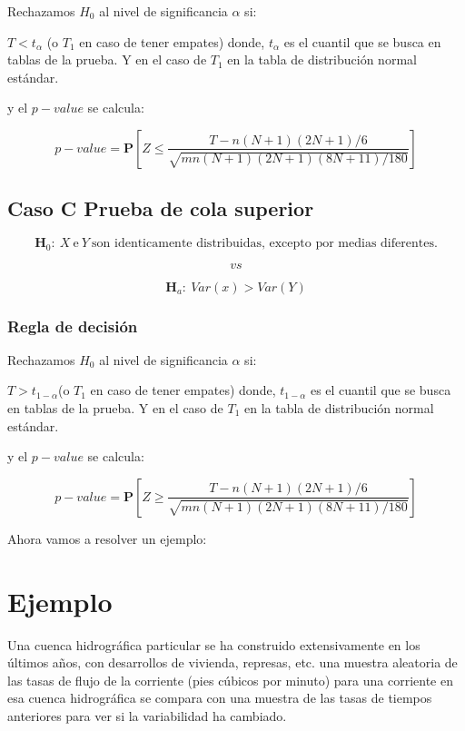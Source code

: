 \documentclass[
  a4paper,
  oneside,
  openany]{book}
\begin{document}
Rechazamos \(H_0\) al nivel de significancia \(\alpha\) si:

\(T<t_\alpha\) (o \(T_1\) en caso de tener empates) donde, \(t_\alpha\) es el cuantil que se busca en tablas de la prueba. Y en el caso de \(T_{1}\) en la tabla de distribución normal estándar.

y el \(p-value\) se calcula:

\[ p-value= \mathbf{P}\left[Z\leq\frac{T-n(N+1)(2N+1)/6}{\sqrt{mn(N+1)(2N+1)(8N+11)/180}}\right]\]

\hypertarget{caso-c-prueba-de-cola-superior-4}{%
\subsection*{Caso C Prueba de cola superior}\label{caso-c-prueba-de-cola-superior-4}}


\[\textbf{H}_0: \ X \  \mbox{e} \  Y \ \mbox{son identicamente distribuidas, excepto por medias diferentes.}\]

\[vs\]

\[\textbf{H}_a: \ Var(x) > Var(Y)\]

\hypertarget{regla-de-decisiuxf3n-19}{%
\subsubsection*{Regla de decisión}\label{regla-de-decisiuxf3n-19}}


Rechazamos \(H_0\) al nivel de significancia \(\alpha\) si:

\(T>t_{1-\alpha}\)(o \(T_1\) en caso de tener empates) donde, \(t_{1-\alpha}\) es el cuantil que se busca en tablas de la prueba. Y en el caso de \(T_{1}\) en la tabla de distribución normal estándar.

y el \(p-value\) se calcula:

\[p-value=\mathbf{P}\left[Z\geq\frac{T-n(N+1)(2N+1)/6}{\sqrt{mn(N+1)(2N+1)(8N+11)/180}}\right]\]

Ahora vamos a resolver un ejemplo:

\hypertarget{ejemplo-8}{%
\section{Ejemplo}\label{ejemplo-8}}

Una cuenca hidrográfica particular se ha construido extensivamente en los últimos años, con desarrollos de vivienda, represas, etc. una muestra aleatoria de las tasas de flujo de la corriente (pies cúbicos por minuto) para una corriente en esa cuenca hidrográfica se compara con una muestra de las tasas de tiempos anteriores para ver si la variabilidad ha cambiado.
\end{document}
